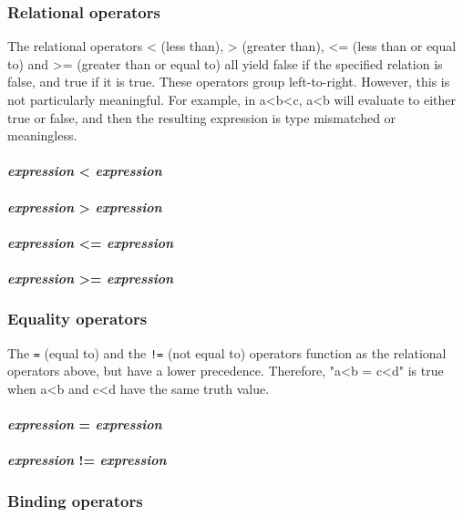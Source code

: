\subsubsection{Relational operators}
The  relational operators < (less than), > (greater than), <= (less than or equal to) and >= (greater than or equal to) all yield false if the specified relation is false, and true if it is true. These operators group left-to-right. However, this is not particularly meaningful. For example, in a<b<c, a<b will evaluate to either true or false, and then the resulting expression is type mismatched or meaningless.

\paragraph{\textit{expression} < \textit{expression}}
\paragraph{\textit{expression} > \textit{expression}}
\paragraph{\textit{expression} <= \textit{expression}}
\paragraph{\textit{expression} >= \textit{expression}}


\subsubsection{Equality operators}
The \texttt{=} (equal to) and the \texttt{!=} (not equal to) operators function as the relational operators above, but have a lower precedence. Therefore, "a<b = c<d" is true when a<b and c<d have the same truth value.
\\
\paragraph{\textit{expression} = \textit{expression}}
\paragraph{\textit{expression} != \textit{expression}}

\subsubsection{Binding operators}
